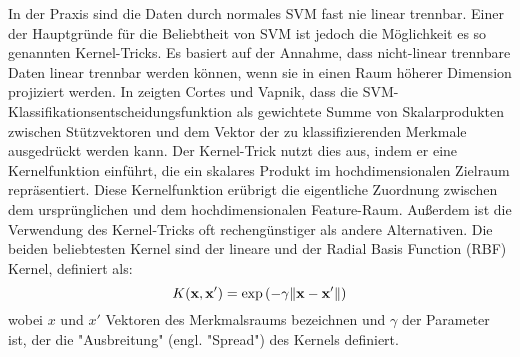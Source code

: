 In der Praxis sind die Daten durch normales SVM fast nie linear trennbar.
Einer der Hauptgründe für die Beliebtheit von SVM ist jedoch die Möglichkeit es so genannten Kernel-Tricks.
Es basiert auf der Annahme, dass nicht-linear trennbare Daten linear trennbar werden können, wenn sie in einen Raum höherer Dimension projiziert werden.
In \cite{svn1995} zeigten Cortes und Vapnik, dass die SVM-Klassifikationsentscheidungsfunktion als gewichtete Summe von Skalarprodukten zwischen Stützvektoren und dem Vektor der zu klassifizierenden Merkmale ausgedrückt werden kann. 
Der Kernel-Trick nutzt dies aus, indem er eine Kernelfunktion einführt, die ein skalares Produkt im hochdimensionalen Zielraum repräsentiert. 
Diese Kernelfunktion erübrigt die eigentliche Zuordnung zwischen dem ursprünglichen und dem hochdimensionalen Feature-Raum.
Außerdem ist die Verwendung des Kernel-Tricks oft rechengünstiger als andere Alternativen.
Die beiden beliebtesten Kernel sind der lineare und der Radial Basis Function (RBF) Kernel, definiert als: 
\begin{equation} 
\Large{ {\displaystyle K(\mathbf {x} ,\mathbf {x'} )=\exp \left(-\gamma{\|\mathbf {x} -\mathbf {x'}}\right\|)} }
\end{equation}
wobei $ x $ und $ x' $ Vektoren des Merkmalsraums bezeichnen und $ \gamma $ der Parameter ist, der die "Ausbreitung" (engl. "Spread") des Kernels definiert. \\


\begin{figure}[h] 
\label{fig:kernel_trick} \end{figure} \vspace{0.5cm}


